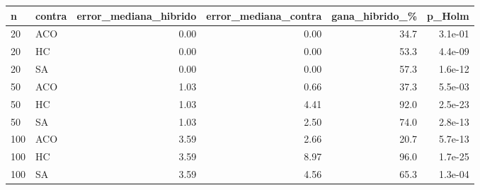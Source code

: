 \begin{tabular}{llrrrr}
\toprule
n & contra & error\_mediana\_hibrido & error\_mediana\_contra & gana\_hibrido\_\% & p\_Holm \\
\midrule
20 & ACO & 0.00 & 0.00 & 34.7 & 3.1e-01 \\
20 & HC & 0.00 & 0.00 & 53.3 & 4.4e-09 \\
20 & SA & 0.00 & 0.00 & 57.3 & 1.6e-12 \\
\midrule
50 & ACO & 1.03 & 0.66 & 37.3 & 5.5e-03 \\
50 & HC & 1.03 & 4.41 & 92.0 & 2.5e-23 \\
50 & SA & 1.03 & 2.50 & 74.0 & 2.8e-13 \\
\midrule
100 & ACO & 3.59 & 2.66 & 20.7 & 5.7e-13 \\
100 & HC & 3.59 & 8.97 & 96.0 & 1.7e-25 \\
100 & SA & 3.59 & 4.56 & 65.3 & 1.3e-04 \\
\bottomrule
\end{tabular}
